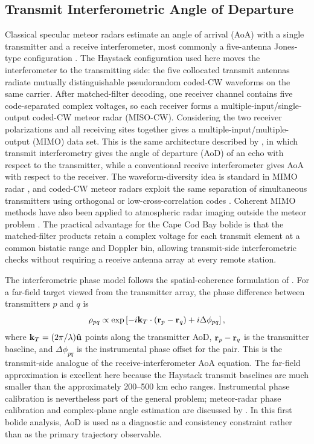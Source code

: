 \subsection{Transmit Interferometric Angle of Departure}

Classical specular meteor radars estimate an angle of arrival (AoA) with a
single transmitter and a receive interferometer, most commonly a five-antenna
Jones-type configuration \cite{jones_1998_interferometer,hocking_2001_realtime,
holdsworth_2004_buckland,holdsworth_2005_allsky}.  The Haystack
configuration used here moves the interferometer to the transmitting side: the
five collocated transmit antennas radiate mutually distinguishable
pseudorandom coded-CW waveforms on the same carrier.  After matched-filter
decoding, one receiver channel contains five code-separated complex voltages,
so each receiver forms a multiple-input/single-output coded-CW meteor radar
(MISO-CW).  Considering the two receiver polarizations and all receiving sites
together gives a multiple-input/multiple-output (MIMO) data set.  This is the
same architecture described by \textcite{chau_2019_mimo}, in which transmit
interferometry gives the angle of departure (AoD) of an echo with respect to
the transmitter, while a conventional receive interferometer gives AoA with
respect to the receiver.  The waveform-diversity idea is standard in MIMO radar
\cite{fishler_2004_mimo,li_stoica_2007_mimo,haimovich_2008_mimo}, and coded-CW
meteor radars exploit the same separation of simultaneous transmitters using
orthogonal or low-cross-correlation codes \cite{vierinen_2016_mimo,
chau_2019_mimo,chau_2021_peru}.  Coherent MIMO methods have also been applied
to atmospheric radar imaging outside the meteor problem
\cite{urco_2018_coherent_mimo,urco_2019_maarsy}.  The practical advantage for
the Cape Cod Bay bolide is that the matched-filter products retain a complex
voltage for each transmit element at a common bistatic range and Doppler bin,
allowing transmit-side interferometric checks without requiring a receive
antenna array at every remote station.

The interferometric phase model follows the spatial-coherence formulation of
\textcite{chau_2019_mimo}.  For a far-field target viewed from the transmitter
array, the phase difference between transmitters \(p\) and \(q\) is
\[
  \rho_{pq} \propto
  \exp\left[-i{\bf k}_T\cdot({\bf r}_p-{\bf r}_q)
             + i\Delta\phi_{pq}\right],
\]
where \({\bf k}_T=(2\pi/\lambda){\bf \hat u}\) points along the transmitter
AoD, \({\bf r}_p-{\bf r}_q\) is the transmitter baseline, and
\(\Delta\phi_{pq}\) is the instrumental phase offset for the pair.  This is
the transmit-side analogue of the receive-interferometer AoA equation.  The
far-field approximation is excellent here because the Haystack transmit
baselines are much smaller than the approximately 200--500 km echo ranges.
Instrumental phase calibration is nevertheless part of the general problem;
meteor-radar phase calibration and complex-plane angle estimation are discussed
by \textcite{holdsworth_2004_phase,chau_clahsen_2019_phase,
vaudrin_2018_complex,younger_reid_2017_precalculated}.  In this first bolide
analysis, AoD is used as a diagnostic and consistency constraint rather than as
the primary trajectory observable.

